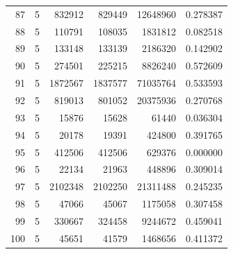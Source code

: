 \begin{longtable}{rrrrrr}
87 & 5 & 832912 & 829449 & 12648960 & 0.278387\\
88 & 5 & 110791 & 108035 & 1831812 & 0.082518\\
89 & 5 & 133148 & 133139 & 2186320 & 0.142902\\
90 & 5 & 274501 & 225215 & 8826240 & 0.572609\\
91 & 5 & 1872567 & 1837577 & 71035764 & 0.533593\\
92 & 5 & 819013 & 801052 & 20375936 & 0.270768\\
93 & 5 & 15876 & 15628 & 61440 & 0.036304\\
94 & 5 & 20178 & 19391 & 424800 & 0.391765\\
95 & 5 & 412506 & 412506 & 629376 & 0.000000\\
96 & 5 & 22134 & 21963 & 448896 & 0.309014\\
97 & 5 & 2102348 & 2102250 & 21311488 & 0.245235\\
98 & 5 & 47066 & 45067 & 1175058 & 0.307458\\
99 & 5 & 330667 & 324458 & 9244672 & 0.459041\\
100 & 5 & 45651 & 41579 & 1468656 & 0.411372\\
\bottomrule\end{longtable}\endgroup
